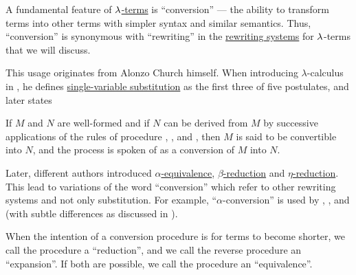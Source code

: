 \begin{concept}\label{con:lambda_conversion}
  A fundamental feature of \hyperref[def:lambda_term]{\( \mathrm{\lambda} \)-terms} is \enquote{conversion} --- the ability to transform terms into other terms with simpler syntax and similar semantics. Thus, \enquote{conversion} is synonymous with \enquote{rewriting} in the \hyperref[def:rewriting_system]{rewriting systems} for \( \mathrm{\lambda} \)-terms that we will discuss.

  This usage originates from Alonzo Church himself. When introducing \( \lambda \)-calculus in \cite[357]{Church1932LambdaCalculus}, he defines \hyperref[def:lambda_term_substitution]{single-variable substitution} as the first three of five postulates, and later states
  \begin{displayquote}
    If \( M \) and \( N \) are well-formed and if \( N \) can be derived from \( M \) by successive applications of the rules of procedure , , and , then \( M \) is said to be convertible into \( N \), and the process is spoken of as a conversion of \( M \) into \( N \).
  \end{displayquote}

  Later, different authors introduced \hyperref[def:lambda_term_alpha_equivalence]{\( \alpha \)-equivalence}, \hyperref[def:beta_eta_reduction]{\( \beta \)-reduction} and \hyperref[def:beta_eta_reduction]{\( \eta \)-reduction}. This lead to variations of the word \enquote{conversion} which refer to other rewriting systems and not only substitution. For example, \enquote{\( \alpha \)-conversion} is used by , ,  and  (with subtle differences as discussed in ).

  When the intention of a conversion procedure is for terms to become shorter, we call the procedure a \enquote{reduction}, and we call the reverse procedure an \enquote{expansion}. If both are possible, we call the procedure an \enquote{equivalence}.
\end{concept}

